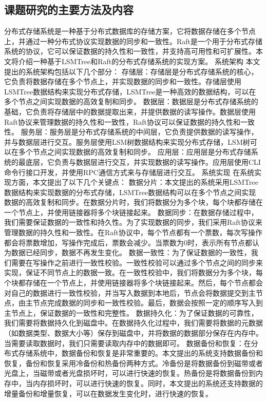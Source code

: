   	\subsection{课题研究的主要方法及内容}

  
  	分布式存储系统是一种基于分布式数据库的存储方案，它将数据存储在多个节点上，并通过一种分布式协议实现数据的同步和一致性。Raft是一个用于分布式存储系统的协议，它可以保证数据的持久性和一致性，并支持高可用性和可扩展性。本文将介绍一种基于LSMTree和Raft的分布式存储系统的实现方案。
系统架构
本文提出的系统架构包括以下几个部分：
存储层：存储层是分布式存储系统的核心，它负责将数据存储在多个节点上，并实现数据的同步和一致性。存储层使用LSMTree数据结构来实现分布式存储，LSMTree是一种高效的数据结构，可以在多个节点之间实现数据的高效复制和同步。
数据层：数据层是分布式存储系统的基础，它负责将存储层中的数据提取出来，并提供数据的读写操作。数据层使用Raft协议来管理数据的持久性和一致性，Raft协议可以保证数据的持久性和一致性。
服务层：服务层是分布式存储系统的中间层，它负责提供数据的读写操作，并与数据层进行交互。服务层使用LSM树数据结构来实现分布式存储，LSM树可以在多个节点之间实现数据的高效复制和同步。
应用层：应用层是分布式存储系统的最底层，它负责与数据层进行交互，并实现数据的读写操作。应用层使用CLI命令行接口开发，并使用RPC通信方式来与存储层进行交互。
系统实现
在系统实现方面，本文提出了以下几个关键点：
数据分片：本文提出的系统采用LSMTree数据结构来实现数据的分布式存储，LSMTree数据结构可以在多个节点之间实现数据的高效复制和同步。在数据分片时，我们将数据分为多个块，每个块都存储在一个节点上，并使用链接器将多个块链接起来。
数据同步：在数据存储过程中，我们需要保证数据的一致性和持久性。为了实现数据的同步，我们采用Raft协议来管理数据的持久性和一致性。在Raft协议中，每个节点都有一个票数，每次写操作都会将票数增加，写操作完成后，票数会减少。当票数为0时，表示所有节点都认为数据已经同步，数据不再发生变化。
数据一致性：为了保证数据的一致性，我们需要在写操作之前进行一致性校验。一致性校验可以通过多个节点之间的同步来实现，保证不同节点上的数据一致。在一致性校验中，我们将数据分为多个块，每个块都存储在一个节点上，并使用链接器将多个块链接起来。然后，每个节点都会对自己的数据进行一致性校验，并当写入数据到本地后，节点会将数据提交到主节点，由主节点完成数据的同步和一致性校验。最后，数据会按照一定的顺序写入到主节点上，保证数据的一致性和完整性。
数据持久化：为了保证数据的可靠性，我们需要将数据持久化到磁盘中。在数据持久化过程中，我们需要将数据的元数据（如数据类型、数据大小等）保存到磁盘中，并将数据的数据部分保存在内存中。当需要读取数据时，我们只需要读取内存中的数据即可。
数据备份和恢复：在分布式存储系统中，数据备份和恢复是非常重要的。本文提出的系统支持数据备份和恢复，备份和恢复采用冷备份和热备份两种方式。冷备份是将数据备份到磁带或者光盘上，当磁带或者光盘损坏时，可以进行快速的恢复。热备份是将数据备份到内存中，当内存损坏时，可以进行快速的恢复。同时，本文提出的系统还支持数据的增量备份和增量恢复，可以在数据发生变化时，进行快速的恢复。
